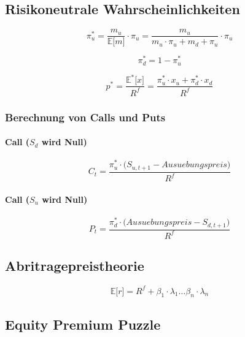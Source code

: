 \subsection{Risikoneutrale Wahrscheinlichkeiten}

\begin{equation}
	\pi^*_u = \frac{m_u}{\mathbb{E} \big\lbrack m \big\rbrack} \cdot \pi_u = \frac{m_u}{m_u \cdot \pi_u + m_d + \pi_u} \cdot \pi_u
\end{equation}

\begin{equation}
	\pi^*_d = 1 - \pi^*_u
\end{equation}

\begin{equation}
	p^* = \frac{\mathbb{E}^* \big\lbrack x \big\rbrack}{R^f} = \frac{\pi^*_u \cdot x_u + \pi^*_d \cdot x_d}{R^f}
\end{equation}

\subsubsection{Berechnung von Calls und Puts}

\paragraph{Call (\(S_d\) wird Null)}
\begin{equation}
	C_t = \frac{\pi^*_u \cdot \big( S_{u,t+1} - Ausuebungspreis \big)}{R^f}
\end{equation}


\paragraph{Call (\(S_u\) wird Null)}
\begin{equation}
	P_t = \frac{\pi^*_d \cdot \big( Ausuebungspreis - S_{d,t+1} \big)}{R^f}
\end{equation}


\subsection{Abritragepreistheorie}
\begin{equation}
	\mathbb{E} \big\lbrack r \big\rbrack = R^f + \beta_1 \cdot \lambda_1 \dots \beta_n \cdot \lambda_n \label{eq:apt}
\end{equation}


\subsection{Equity Premium Puzzle}

